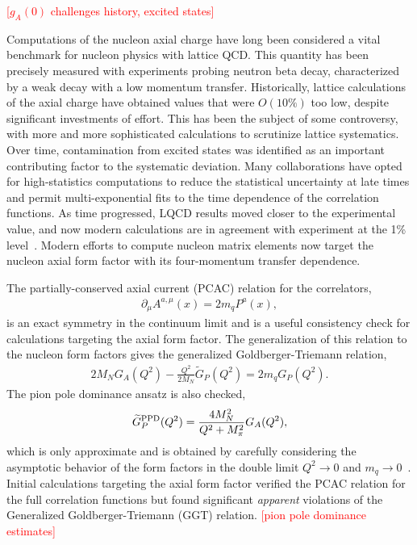 
\textcolor{red}{[$g_A(0)$ challenges history, excited states]}

Computations of the nucleon axial charge have long been considered
 a vital benchmark for nucleon physics with lattice QCD.
This quantity has been precisely measured with experiments probing neutron beta decay,
 characterized by a weak decay with a low momentum transfer.
Historically, lattice calculations of the axial charge have obtained values
 that were $O(10\%)$ too low, despite significant investments of effort.
This has been the subject of some controversy,
 with more and more sophisticated calculations to scrutinize lattice systematics.
Over time, contamination from excited states was identified as
 an important contributing factor to the systematic deviation.
Many collaborations have opted for high-statistics computations
 to reduce the statistical uncertainty at late times and permit
 multi-exponential fits to the time dependence of the correlation functions.
As time progressed, LQCD results moved closer to the experimental value,
 and now modern calculations are in agreement with experiment
 at the 1\% level~\cite{Kronfeld:2019nfb}.
Modern efforts to compute nucleon matrix elements now target the nucleon
 axial form factor with its four-momentum transfer dependence.

The partially-conserved axial current (PCAC) relation for the correlators,
\begin{align}
 \partial_\mu A^{a,\mu}(x) = 2 m_q P^{a}(x),
 \label{eq:pcac}
\end{align}
 is an exact symmetry in the continuum limit and is a useful
 consistency check for calculations targeting the axial form factor.
The generalization of this relation to the nucleon form factors
 gives the generalized Goldberger-Triemann relation,
\begin{align}
 2 M_N G_A(Q^2) -\frac{Q^2}{2M_N} \widetilde{G}_P(Q^2) = 2 m_q G_{P}(Q^2).
 \label{eq:ggt}
\end{align}
The pion pole dominance ansatz is also checked,
\begin{align}
 \widetilde{G}^{\rm PPD}_P(Q^2) = \frac{4M_N^2}{Q^2+M_\pi^2} G_A(Q^2),
 \label{eq:ppd}
\end{align}
 which is only approximate and is obtained
 by carefully considering the asymptotic behavior of the
 form factors in the double limit $Q^2\to0$ and $m_q\to0$~\cite{Sasaki:2007gw}.
Initial calculations targeting the axial form factor verified the PCAC relation
 for the full correlation functions but found significant \emph{apparent} violations
 of the Generalized Goldberger-Triemann (GGT) relation.
\textcolor{red}{[pion pole dominance estimates]}

